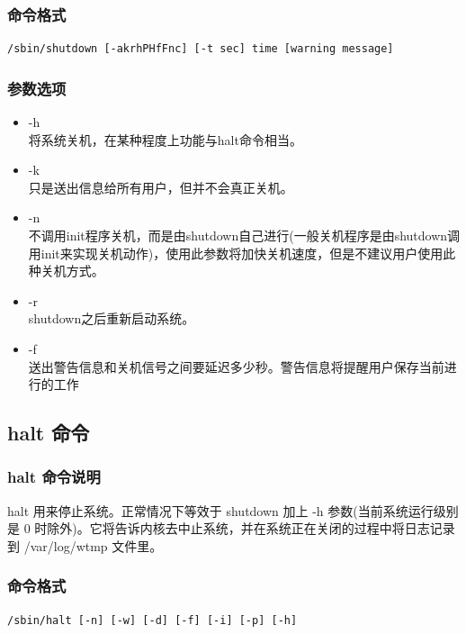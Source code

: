 \subsubsection{命令格式}

{\begin{shaded}\begin{verbatim}
/sbin/shutdown [-akrhPHfFnc] [-t sec] time [warning message]
\end{verbatim}\end{shaded}}
\subsubsection{参数选项}

\begin{itemize}
\item
  -h\\ 将系统关机，在某种程度上功能与halt命令相当。
\item
  -k\\ 只是送出信息给所有用户，但并不会真正关机。
\item
  -n\\
  不调用init程序关机，而是由shutdown自己进行(一般关机程序是由shutdown调用init来实现关机动作)，使用此参数将加快关机速度，但是不建议用户使用此种关机方式。
\item
  -r\\ shutdown之后重新启动系统。
\item
  -f \\
  送出警告信息和关机信号之间要延迟多少秒。警告信息将提醒用户保存当前进行的工作
\end{itemize}
\subsection{halt 命令}

\subsubsection{halt 命令说明}

halt 用来停止系统。正常情况下等效于 shutdown 加上 -h
参数(当前系统运行级别是 0
时除外)。它将告诉内核去中止系统，并在系统正在关闭的过程中将日志记录到
/var/log/wtmp 文件里。

\subsubsection{命令格式}

{\begin{shaded}\begin{verbatim}
/sbin/halt [-n] [-w] [-d] [-f] [-i] [-p] [-h]
\end{verbatim}\end{shaded}}
